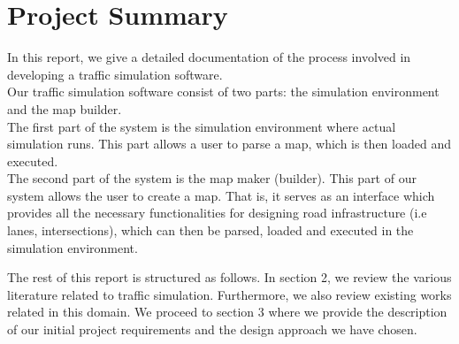\section*{Project Summary}
In this report, we give a detailed documentation of the process involved in developing a traffic simulation software. \\
Our traffic simulation software consist of two parts: the simulation environment and the map builder. \\
The first part of the system is the simulation environment where actual simulation runs. This part allows a user to parse a map, which is then loaded and executed.\\
The second part of the system is the map maker (builder). This part of our system allows the user to create a map. That is, it serves as an interface which provides all the necessary functionalities for designing road infrastructure (i.e lanes, intersections), which can then be parsed, loaded and executed in the simulation environment.
\par{}
The rest of this report is structured as follows. In section 2, we review the various literature related to traffic simulation. Furthermore, we also review existing works related in this domain. We proceed to section 3 where we provide the description of our initial project requirements  and the design approach we have chosen.